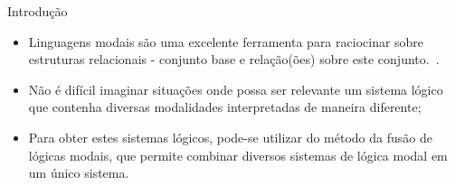 \begin{frame}{Introdução}
    \begin{itemize}
        \item Linguagens modais são uma excelente ferramenta para raciocinar sobre estruturas relacionais - conjunto base e relação(ões) sobre este conjunto.~\cite{blackburn2001modal}.
        \item Não é difícil imaginar situações onde possa ser relevante um sistema lógico que contenha diversas modalidades interpretadas de maneira diferente;
        \item Para obter estes sistemas lógicos, pode-se utilizar do método da fusão de lógicas modais, que permite combinar diversos sistemas de lógica modal em um único sistema.
    \end{itemize}
\end{frame}